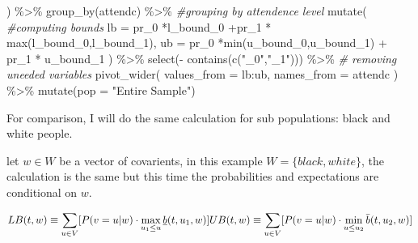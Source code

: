 \documentclass[
]{article}
\newenvironment{Shaded}{\begin{snugshade}}{\end{snugshade}}
\newcommand{\AttributeTok}[1]{\textcolor[rgb]{0.77,0.63,0.00}{#1}}
\newcommand{\CommentTok}[1]{\textcolor[rgb]{0.56,0.35,0.01}{\textit{#1}}}
\newcommand{\FunctionTok}[1]{\textcolor[rgb]{0.00,0.00,0.00}{#1}}
\newcommand{\NormalTok}[1]{#1}
\newcommand{\SpecialCharTok}[1]{\textcolor[rgb]{0.00,0.00,0.00}{#1}}
\newcommand{\StringTok}[1]{\textcolor[rgb]{0.31,0.60,0.02}{#1}}
\begin{document}
\begin{Shaded}
\begin{Highlighting}[]
\NormalTok{      ) }\SpecialCharTok{\%\textgreater{}\%}
     \FunctionTok{group\_by}\NormalTok{(attendc) }\SpecialCharTok{\%\textgreater{}\%}             \CommentTok{\#grouping by attendence level}
     \FunctionTok{mutate}\NormalTok{(                           }\CommentTok{\#computing bounds}
       \AttributeTok{lb =}\NormalTok{ pr\_0 }\SpecialCharTok{*}\NormalTok{l\_bound\_0 }\SpecialCharTok{+}\NormalTok{pr\_1 }\SpecialCharTok{*} \FunctionTok{max}\NormalTok{(l\_bound\_0,l\_bound\_1),      }
       \AttributeTok{ub =}\NormalTok{ pr\_0 }\SpecialCharTok{*}\FunctionTok{min}\NormalTok{(u\_bound\_0,u\_bound\_1) }\SpecialCharTok{+}\NormalTok{ pr\_1 }\SpecialCharTok{*}\NormalTok{ u\_bound\_1}
\NormalTok{            ) }\SpecialCharTok{\%\textgreater{}\%} 
     \FunctionTok{select}\NormalTok{(}\SpecialCharTok{{-}} \FunctionTok{contains}\NormalTok{(}\FunctionTok{c}\NormalTok{(}\StringTok{"\_0"}\NormalTok{,}\StringTok{"\_1"}\NormalTok{))) }\SpecialCharTok{\%\textgreater{}\%}  \CommentTok{\# removing uneeded variables}
    \FunctionTok{pivot\_wider}\NormalTok{(}
      \AttributeTok{values\_from =}\NormalTok{ lb}\SpecialCharTok{:}\NormalTok{ub,}
      \AttributeTok{names\_from =}\NormalTok{ attendc}
\NormalTok{    ) }\SpecialCharTok{\%\textgreater{}\%} \FunctionTok{mutate}\NormalTok{(}\AttributeTok{pop =} \StringTok{"Entire Sample"}\NormalTok{)}
\end{Highlighting}
\end{Shaded}

For comparison, I will do the same calculation for sub populations:
black and white people.

let \(w \in W\) be a vector of covarients, in this example
\(W = \{black,white\}\), the calculation is the same but this time the
probabilities and expectations are conditional on \(w\).

\[ LB(t,w) \equiv \sum_{u \in V}[P(v = u|w)\cdot   \max_{u_1 \le u} \underline{b}(t,u_1,w)]\\
UB(t,w) \equiv \sum_{u \in V}[P(v = u|w)\cdot   \min_{u \le u_2}\bar{b}(t,u_2,w)]
\]
\end{document}
